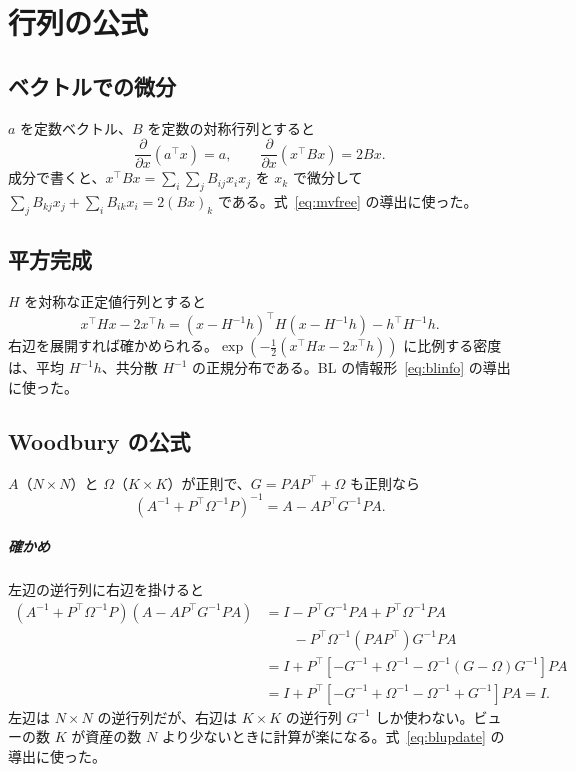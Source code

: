 \documentclass[xelatex,ja=standard,jafont=hiragino-pron,a4paper,11pt,openany]{bxjsreport}
\newcommand{\T}{^{\top}}
\begin{document}
\appendix
\chapter{行列の公式}\label{app:formulas}

\section{ベクトルでの微分}

$a$ を定数ベクトル、$B$ を定数の対称行列とすると
\[
\frac{\partial}{\partial x}(a\T x) = a,\qquad
\frac{\partial}{\partial x}(x\T B x) = 2Bx .
\]
成分で書くと、$x\T Bx = \sum_i\sum_j B_{ij}x_i x_j$ を $x_k$ で微分して $\sum_j B_{kj}x_j + \sum_i B_{ik}x_i = 2(Bx)_k$ である。式~\eqref{eq:mvfree} の導出に使った。

\section{平方完成}

$H$ を対称な正定値行列とすると
\[
x\T Hx - 2x\T h = (x - H^{-1}h)\T H(x - H^{-1}h) - h\T H^{-1}h .
\]
右辺を展開すれば確かめられる。$\exp(-\frac{1}{2}(x\T Hx - 2x\T h))$ に比例する密度は、平均 $H^{-1}h$、共分散 $H^{-1}$ の正規分布である。BL の情報形~\eqref{eq:blinfo} の導出に使った。

\section{Woodbury の公式}

$A$（$N \times N$）と $\Omega$（$K \times K$）が正則で、$G = PAP\T + \Omega$ も正則なら
\[
(A^{-1} + P\T\Omega^{-1}P)^{-1} = A - AP\T G^{-1}PA .
\]
\paragraph{確かめ}
左辺の逆行列に右辺を掛けると
\begin{align*}
(A^{-1} + P\T\Omega^{-1}P)(A - AP\T G^{-1}PA)
&= I - P\T G^{-1}PA + P\T\Omega^{-1}PA \\
&\qquad - P\T\Omega^{-1}(PAP\T)G^{-1}PA \\
&= I + P\T\left[-G^{-1} + \Omega^{-1} - \Omega^{-1}(G - \Omega)G^{-1}\right]PA \\
&= I + P\T\left[-G^{-1} + \Omega^{-1} - \Omega^{-1} + G^{-1}\right]PA = I .
\end{align*}
左辺は $N \times N$ の逆行列だが、右辺は $K \times K$ の逆行列 $G^{-1}$ しか使わない。ビューの数 $K$ が資産の数 $N$ より少ないときに計算が楽になる。式~\eqref{eq:blupdate} の導出に使った。
\end{document}
